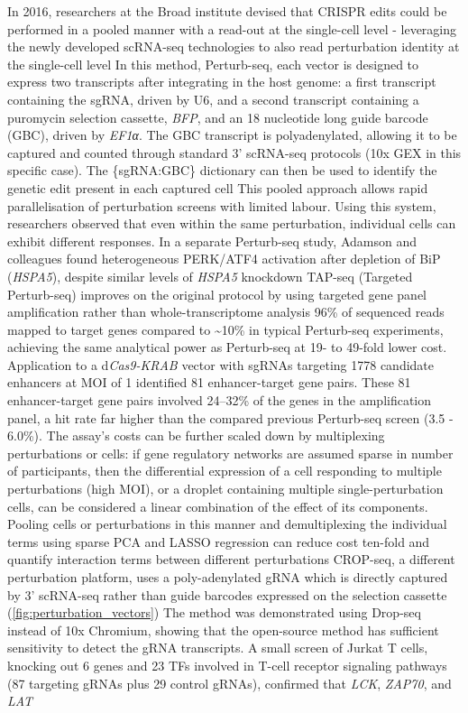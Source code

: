 In 2016, researchers at the Broad institute devised that CRISPR edits could be performed in a pooled manner with a read-out at the single-cell level - leveraging the newly developed scRNA-seq technologies to also read perturbation identity at the single-cell level In this method, Perturb-seq, each vector is designed to express two transcripts after integrating in the host genome: a first transcript containing the sgRNA, driven by U6, and a second transcript containing a puromycin selection cassette, \textit{BFP}, and an 18 nucleotide long guide barcode (GBC), driven by \textit{EF1{\greekfont α}}. The GBC transcript is polyadenylated, allowing it to be captured and counted through standard 3' scRNA-seq protocols (10x GEX in this specific case). The \{sgRNA:GBC\} dictionary can then be used to identify the genetic edit present in each captured cell This pooled approach allows rapid parallelisation of perturbation screens with limited labour. Using this system, researchers observed that even within the same perturbation, individual cells can exhibit different responses. In a separate Perturb-seq study, Adamson and colleagues found heterogeneous PERK/ATF4 activation after depletion of BiP (\textit{HSPA5}), despite similar levels of \textit{HSPA5} knockdown TAP-seq (Targeted Perturb-seq) improves on the original protocol by using targeted gene panel amplification rather than whole-transcriptome analysis 96\% of sequenced reads mapped to target genes compared to \textasciitilde10\% in typical Perturb-seq experiments, achieving the same analytical power as Perturb-seq at 19- to 49-fold lower cost. Application to a d\textit{Cas9-KRAB} vector with sgRNAs targeting \num{1778} candidate enhancers at MOI of 1 identified 81 enhancer-target gene pairs. These 81 enhancer-target gene pairs involved 24--32\% of the genes in the amplification panel, a hit rate far higher than the compared previous Perturb-seq screen (3.5 - 6.0\%). The assay's costs can be further scaled down by multiplexing perturbations or cells: if gene regulatory networks are assumed sparse in number of participants, then the differential expression of a cell responding to multiple perturbations (high MOI), or a droplet containing multiple single-perturbation cells, can be considered a linear combination of the effect of its components. Pooling cells or perturbations in this manner and demultiplexing the individual terms using sparse PCA and LASSO regression can reduce cost ten-fold and quantify interaction terms between different perturbations CROP-seq, a different perturbation platform, uses a poly-adenylated gRNA which is directly captured by 3' scRNA-seq rather than guide barcodes expressed on the selection cassette (\autoref{fig:perturbation_vectors}) The method was demonstrated using Drop-seq instead of 10x Chromium, showing that the open-source method has sufficient sensitivity to detect the gRNA transcripts. A small screen of Jurkat T cells, knocking out 6 genes and 23 TFs involved in T-cell receptor signaling pathways (87 targeting gRNAs plus 29 control gRNAs), confirmed that \textit{LCK}, \textit{ZAP70}, and \textit{LAT} 